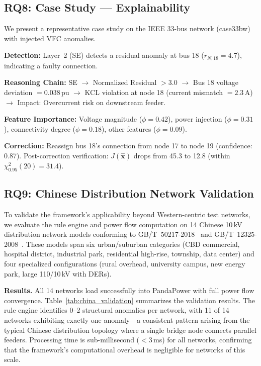 \documentclass[research]{fcs}
\begin{document}
\subsection{RQ8: Case Study --- Explainability}

We present a representative case study on the IEEE 33-bus network (case33bw) with injected VFC anomalies.

\textbf{Detection:} Layer~2 (SE) detects a residual anomaly at bus 18 ($r_{N,18} = 4.7$), indicating a faulty connection.

\textbf{Reasoning Chain:} SE $\rightarrow$ Normalized Residual $> 3.0$ $\rightarrow$ Bus 18 voltage deviation $= 0.038$\,pu $\rightarrow$ KCL violation at node 18 (current mismatch $= 2.3$\,A) $\rightarrow$ Impact: Overcurrent risk on downstream feeder.

\textbf{Feature Importance:} Voltage magnitude ($\phi = 0.42$), power injection ($\phi = 0.31$), connectivity degree ($\phi = 0.18$), other features ($\phi = 0.09$).

\textbf{Correction:} Reassign bus 18's connection from node 17 to node 19 (confidence: 0.87). Post-correction verification: $J(\hat{\mathbf{x}})$ drops from 45.3 to 12.8 (within $\chi^2_{0.95}(20) = 31.4$).

\subsection{RQ9: Chinese Distribution Network Validation}

To validate the framework's applicability beyond Western-centric test networks, we evaluate the rule engine and power flow computation on 14 Chinese 10\,kV distribution network models conforming to GB/T~50217-2018~\cite{gb50217} and GB/T~12325-2008~\cite{gb12325}. These models span six urban/suburban categories (CBD commercial, hospital district, industrial park, residential high-rise, township, data center) and four specialized configurations (rural overhead, university campus, new energy park, large 110/10\,kV with DERs).

\textbf{Results.} All 14 networks load successfully into PandaPower with full power flow convergence. Table~\ref{tab:china_validation} summarizes the validation results. The rule engine identifies 0--2 structural anomalies per network, with 11 of 14 networks exhibiting exactly one anomaly---a consistent pattern arising from the typical Chinese distribution topology where a single bridge node connects parallel feeders. Processing time is sub-millisecond ($<$3\,ms) for all networks, confirming that the framework's computational overhead is negligible for networks of this scale.
\end{document}
